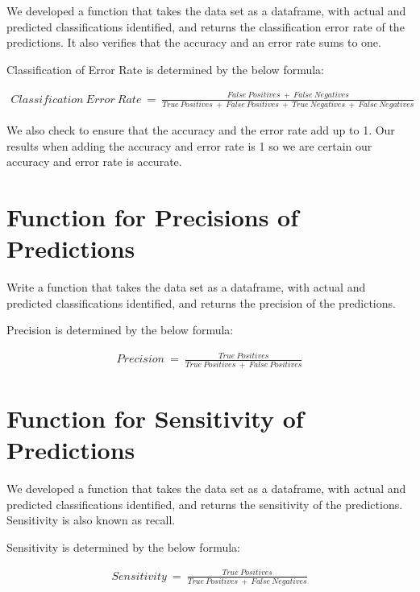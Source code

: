 \documentclass[]{article}
\begin{document}
We developed a function that takes the data set as a dataframe, with
actual and predicted classifications identified, and returns the
classification error rate of the predictions. It also verifies that the
accuracy and an error rate sums to one.

Classification of Error Rate is determined by the below formula:

\[
\begin{aligned}
Classification~Error~Rate~=~\frac{False~Positives~+~False~Negatives}{True~Positives~+~False~Positives~+~True~Negatives~+~False~Negatives}
\end{aligned}
\]

We also check to ensure that the accuracy and the error rate add up to
1. Our results when adding the accuracy and error rate is 1 so we are
certain our accuracy and error rate is accurate.

\section{Function for Precisions of
Predictions}\label{function-for-precisions-of-predictions}

Write a function that takes the data set as a dataframe, with actual and
predicted classifications identified, and returns the precision of the
predictions.

Precision is determined by the below formula:

\[
\begin{aligned}
Precision~=~\frac{True~Positives}{True~Positives~+~False~Positives}
\end{aligned}
\]

\section{Function for Sensitivity of
Predictions}\label{function-for-sensitivity-of-predictions}

We developed a function that takes the data set as a dataframe, with
actual and predicted classifications identified, and returns the
sensitivity of the predictions. Sensitivity is also known as recall.

Sensitivity is determined by the below formula:

\[
\begin{aligned}
Sensitivity~=~\frac{True~Positives}{True~Positives~+~False~Negatives}
\end{aligned}
\]

\newpage
\end{document}
